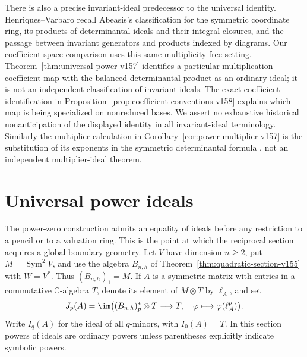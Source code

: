 \documentclass[11pt,reqno]{amsart}
\numberwithin{equation}{section}
\theoremstyle{definition}\newtheorem{definition}[theorem]{Definition}
\theoremstyle{remark}\newtheorem{remark}[theorem]{Remark}
\newcommand{\C}{\mathbb C}\newcommand{\Q}{\mathbb Q}
\DeclareMathOperator{\Sym}{Sym}\DeclareMathOperator{\Gr}{Gr}
\begin{document}
There is also a precise invariant-ideal predecessor to the universal
identity. Henriques--Varbaro \cite[\S2.4, Theorems~2.6--2.8]{HenriquesVarbaro2016}
recall Abeasis's classification for the symmetric coordinate ring,
its products of determinantal ideals and their integral closures,
and the passage between invariant generators and products indexed
by diagrams. Our coefficient-space comparison uses this same
multiplicity-free setting. Theorem~\ref{thm:universal-power-v157}
identifies a particular multiplication coefficient map with the
balanced determinantal product as an ordinary ideal; it is not
an independent classification of invariant ideals. The exact
coefficient identification in Proposition~\ref{prop:coefficient-conventions-v158}
explains which map is being specialized on nonreduced bases.
We assert no exhaustive historical nonanticipation of the displayed
identity in all invariant-ideal terminology. Similarly the
multiplier calculation in Corollary~\ref{cor:power-multiplier-v157} is the
substitution of its exponents in the symmetric determinantal formula
\cite[Theorem~4.8]{HenriquesVarbaro2016}, not an independent
multiplier-ideal theorem.


\section{Universal power ideals}
\label{sec:universal-power-v157}
The power-zero construction admits an equality of ideals before any
restriction to a pencil or to a valuation ring. This is the point at
which the reciprocal section acquires a global boundary geometry.
Let $V$ have dimension $n\geq2$, put $M=\Sym^2V$, and use the algebra
$B_{n,h}$ of Theorem~\ref{thm:quadratic-section-v155} with $W=V^*$.
Thus $(B_{n,h})_1=M$. If $A$ is a symmetric matrix with entries in a
commutative $\C$-algebra $T$, denote its element of $M\otimes T$ by
$\ell_A$, and set
\begin{equation}\label{eq:universal-power-definition-v157}
 J_p(A)=\im\bigl((B_{n,h})_p^*\otimes T\longrightarrow T,
                  \quad\varphi\longmapsto\varphi(\ell_A^p)\bigr).
\end{equation}
Write $I_q(A)$ for the ideal of all $q$-minors, with $I_0(A)=T$.
In this section powers of ideals are ordinary powers unless parentheses
explicitly indicate symbolic powers.
\end{document}
